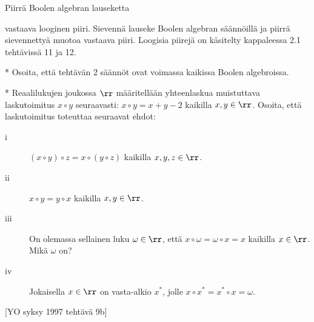 \begin{tehtava}
	Piirrä Boolen algebran lauseketta
	\begin{alakohdat}
	\end{alakohdat}
	vastaava looginen piiri. Sievennä lauseke Boolen algebran säännöillä ja piirrä sievennettyä muotoa vastaava piiri. Loogisia piirejä on käsitelty kappaleessa 2.1 tehtävissä 11 ja 12.
	\begin{vastaus}
		\begin{alakohdat}
			\alakohta{$x+(y\cdot z)$}
			\alakohta{$x$}
			\alakohta{$x+y$}
		\end{alakohdat}
	\end{vastaus}
\end{tehtava}

\begin{tehtava}
	* Osoita, että tehtävän 2 säännöt ovat voimassa kaikissa Boolen algebroissa.
\end{tehtava}

\begin{tehtava}
	* Reaalilukujen joukossa $\rr$ määritellään yhteenlaskua muistuttava laskutoimitus $x \circ y$ seuraavasti: $x \circ y = x + y - 2$ kaikilla $x, y \in \rr$. Osoita, että laskutoimitus toteuttaa seuraavat ehdot: 
	\begin{description}
	\item[i]
	$(x \circ y) \circ z = x \circ (y \circ z)$ kaikilla $x, y, z \in \rr$. 
	\item[ii]
	$x \circ y = y \circ x$ kaikilla $x, y \in \rr$. 
	\item[iii]
	On olemassa sellainen luku $\omega \in \rr$, että $x \circ \omega = \omega \circ x = x$ kaikilla $x \in \rr$. Mikä $\omega$ on? 
	\item[iv]
	Jokaisella $x \in \rr$ on vasta-alkio $x^*$, jolle $x \circ x^* = x^* \circ x = \omega$. 
	\end{description}
	[YO syksy 1997 tehtävä 9b]
\end{tehtava}
